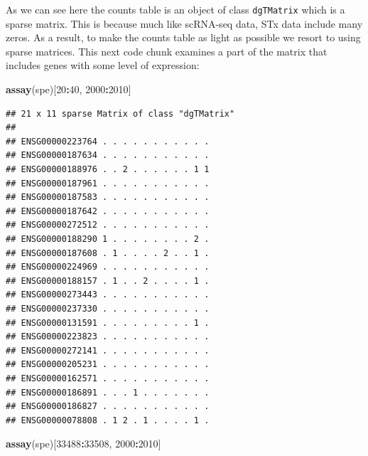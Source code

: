 \documentclass[
]{book}
\newenvironment{Shaded}{\begin{snugshade}}{\end{snugshade}}
\newcommand{\DecValTok}[1]{\textcolor[rgb]{0.00,0.00,0.81}{#1}}
\newcommand{\FunctionTok}[1]{\textcolor[rgb]{0.13,0.29,0.53}{\textbf{#1}}}
\newcommand{\NormalTok}[1]{#1}
\newcommand{\SpecialCharTok}[1]{\textcolor[rgb]{0.81,0.36,0.00}{\textbf{#1}}}
\begin{document}
As we can see here the counts table is an object of class \texttt{dgTMatrix} which is a sparse matrix. This is because much like scRNA-seq data, STx data include many zeros. As a result, to make the counts table as light as possible we resort to using sparse matrices. This next code chunk examines a part of the matrix that includes genes with some level of expression:

\begin{Shaded}
\begin{Highlighting}[]
\FunctionTok{assay}\NormalTok{(spe)[}\DecValTok{20}\SpecialCharTok{:}\DecValTok{40}\NormalTok{, }\DecValTok{2000}\SpecialCharTok{:}\DecValTok{2010}\NormalTok{]}
\end{Highlighting}
\end{Shaded}

\begin{verbatim}
## 21 x 11 sparse Matrix of class "dgTMatrix"
##                                      
## ENSG00000223764 . . . . . . . . . . .
## ENSG00000187634 . . . . . . . . . . .
## ENSG00000188976 . . 2 . . . . . . 1 1
## ENSG00000187961 . . . . . . . . . . .
## ENSG00000187583 . . . . . . . . . . .
## ENSG00000187642 . . . . . . . . . . .
## ENSG00000272512 . . . . . . . . . . .
## ENSG00000188290 1 . . . . . . . . 2 .
## ENSG00000187608 . 1 . . . . 2 . . 1 .
## ENSG00000224969 . . . . . . . . . . .
## ENSG00000188157 . 1 . . 2 . . . . 1 .
## ENSG00000273443 . . . . . . . . . . .
## ENSG00000237330 . . . . . . . . . . .
## ENSG00000131591 . . . . . . . . . 1 .
## ENSG00000223823 . . . . . . . . . . .
## ENSG00000272141 . . . . . . . . . . .
## ENSG00000205231 . . . . . . . . . . .
## ENSG00000162571 . . . . . . . . . . .
## ENSG00000186891 . . . 1 . . . . . . .
## ENSG00000186827 . . . . . . . . . . .
## ENSG00000078808 . 1 2 . 1 . . . . 1 .
\end{verbatim}

\begin{Shaded}
\begin{Highlighting}[]
\FunctionTok{assay}\NormalTok{(spe)[}\DecValTok{33488}\SpecialCharTok{:}\DecValTok{33508}\NormalTok{, }\DecValTok{2000}\SpecialCharTok{:}\DecValTok{2010}\NormalTok{]}
\end{Highlighting}
\end{Shaded}
\end{document}
